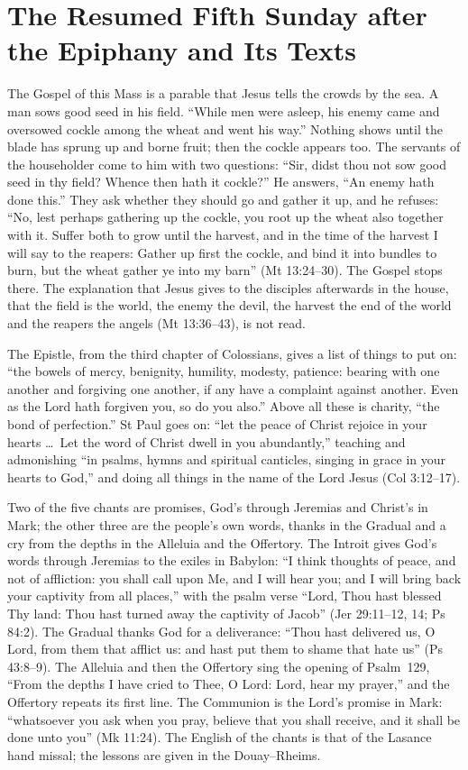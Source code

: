 \section{The Resumed Fifth Sunday after the Epiphany and Its Texts}
\label{sec:opening}

The Gospel of this Mass is a parable that Jesus tells the crowds by the sea.
A man sows good seed in his field. ``While men were asleep, his enemy came and
oversowed cockle among the wheat and went his way.'' Nothing shows until the
blade has sprung up and borne fruit; then the cockle appears too. The servants
of the householder come to him with two questions: ``Sir, didst thou not sow
good seed in thy field? Whence then hath it cockle?'' He answers, ``An enemy
hath done this.'' They ask whether they should go and gather it up, and he
refuses: ``No, lest perhaps gathering up the cockle, you root up the wheat also
together with it. Suffer both to grow until the harvest, and in the time of
the harvest I will say to the reapers: Gather up first the cockle, and bind it
into bundles to burn, but the wheat gather ye into my barn'' (Mt 13:24--30).
The Gospel stops there. The explanation that Jesus gives to the disciples
afterwards in the house, that the field is the world, the enemy the devil, the
harvest the end of the world and the reapers the angels (Mt 13:36--43), is
not read.

The Epistle, from the third chapter of Colossians, gives a list of things to
put on: ``the bowels of mercy, benignity, humility, modesty, patience: bearing
with one another and forgiving one another, if any have a complaint against
another. Even as the Lord hath forgiven you, so do you also.'' Above all these
is charity, ``the bond of perfection.'' St Paul goes on: ``let the peace of
Christ rejoice in your hearts \dots\ Let the word of Christ dwell in you
abundantly,'' teaching and admonishing ``in psalms, hymns and spiritual
canticles, singing in grace in your hearts to God,'' and doing all things in
the name of the Lord Jesus (Col 3:12--17).

Two of the five chants are promises, God's through Jeremias and Christ's in
Mark; the other three are the people's own words, thanks in the Gradual and a
cry from the depths in the Alleluia and the Offertory. The Introit gives God's
words through Jeremias to the exiles in Babylon: ``I think
thoughts of peace, and not of affliction: you shall call upon Me, and I will
hear you; and I will bring back your captivity from all places,'' with the
psalm verse ``Lord, Thou hast blessed Thy land: Thou hast turned away the
captivity of Jacob'' (Jer 29:11--12, 14; Ps 84:2). The Gradual thanks God
for a deliverance: ``Thou hast delivered us, O Lord, from them that afflict
us: and hast put them to shame that hate us'' (Ps 43:8--9). The Alleluia and
then the Offertory sing the opening of Psalm~129, ``From the depths I have
cried to Thee, O Lord: Lord, hear my prayer,'' and the Offertory repeats its
first line. The Communion is the Lord's promise in Mark: ``whatsoever you ask
when you pray, believe that you shall receive, and it shall be done unto
you'' (Mk 11:24). The English of the chants is that of the Lasance hand missal;
the lessons are given in the Douay--Rheims.


